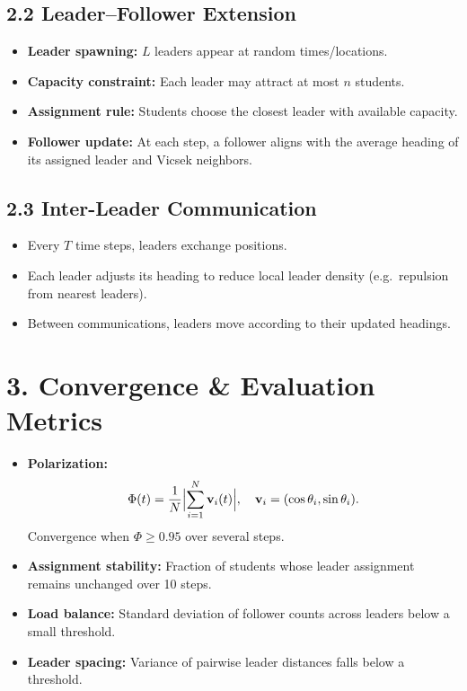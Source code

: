 \documentclass[11pt]{article}
\begin{document}
\subsection*{2.2 Leader–Follower Extension}
\begin{itemize}
  \item \textbf{Leader spawning:} $L$ leaders appear at random times/locations.
  \item \textbf{Capacity constraint:} Each leader may attract at most $n$ students.
  \item \textbf{Assignment rule:} Students choose the closest leader with available capacity.
  \item \textbf{Follower update:} At each step, a follower aligns with the average heading of its assigned leader and Vicsek neighbors.
\end{itemize}

\subsection*{2.3 Inter-Leader Communication}
\begin{itemize}
  \item Every $T$ time steps, leaders exchange positions.
  \item Each leader adjusts its heading to reduce local leader density (e.g.\ repulsion from nearest leaders).
  \item Between communications, leaders move according to their updated headings.
\end{itemize}

\section*{3. Convergence \& Evaluation Metrics}
\begin{itemize}
  \item \textbf{Polarization:} 
    \[
      \Phi(t) = \frac{1}{N}\Bigl\lvert\sum_{i=1}^N\mathbf{v}_i(t)\Bigr\rvert,\quad
      \mathbf{v}_i = (\cos\theta_i,\sin\theta_i).
    \]
    Convergence when $\Phi\ge0.95$ over several steps.
  \item \textbf{Assignment stability:} Fraction of students whose leader assignment remains unchanged over 10 steps.
  \item \textbf{Load balance:} Standard deviation of follower counts across leaders below a small threshold.
  \item \textbf{Leader spacing:} Variance of pairwise leader distances falls below a threshold.
\end{itemize}
\end{document}
